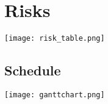 





\chapter{Risks}

\begin{center}
	\texttt{[image: risk\_table.png]}
\end{center}


\begin{landscape}
	\chapter{Schedule}
		\texttt{[image: ganttchart.png]}
\end{landscape}


